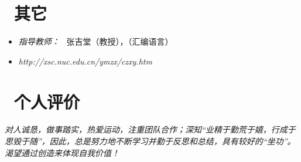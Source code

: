 \documentclass{resume}
\begin{document}
\section{\faHeartO\ 其它}
\begin{itemize}[parsep=0.5ex]
  \item {}
    \textit{\large{指导教师：}} \ 张吉堂（教授），（汇编语言）\\
  \item {}
    \textit{http://xsc.nuc.edu.cn/ymzx/czxy.htm}
\end{itemize}

%
%

\section{\faFlag \ 个人评价}
 \textit{\qquad 对人诚恳，做事踏实，热爱运动，注重团队合作；深知“业精于勤荒于嬉，行成于思毁于随”，因此，总是努力地不断学习并勤于反思和总结，具有较好的“坐功”。渴望通过创造来体现自我价值！}
\end{document}
